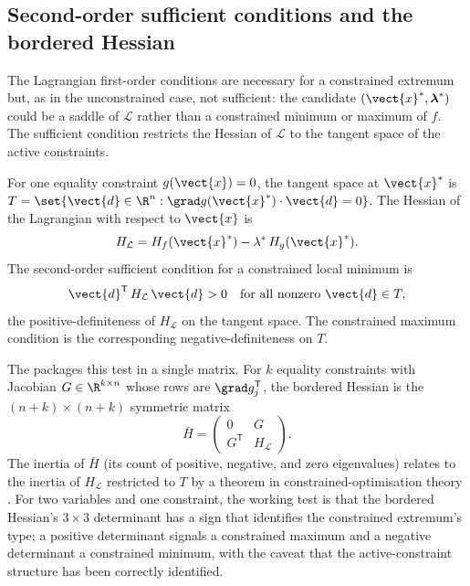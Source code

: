 \subsection{Second-order sufficient conditions and the bordered
Hessian}

The Lagrangian first-order conditions are necessary for a constrained
extremum but, as in the unconstrained case, not sufficient: the
candidate $(\vect{x}^{*}, \boldsymbol{\lambda}^{*})$ could be a
saddle of $\mathcal{L}$ rather than a constrained minimum or maximum
of $f$. The sufficient condition restricts the Hessian of
$\mathcal{L}$ to the tangent space of the active constraints.

For one equality constraint $g(\vect{x}) = 0$, the tangent space at
$\vect{x}^{*}$ is $T = \set{\vect{d} \in \R^{n} : \grad
g(\vect{x}^{*}) \cdot \vect{d} = 0}$. The Hessian of the Lagrangian
with respect to $\vect{x}$ is
\[
H_{\mathcal{L}} =
H_{f}(\vect{x}^{*}) - \lambda^{*}\,H_{g}(\vect{x}^{*}).
\]
The second-order sufficient condition for a constrained local
minimum is
\[
\vect{d}^{\mathsf{T}}\,H_{\mathcal{L}}\,\vect{d} > 0 \quad
\text{for all nonzero } \vect{d} \in T,
\]
the positive-definiteness of $H_{\mathcal{L}}$ on the tangent space.
The constrained maximum condition is the corresponding
negative-definiteness on $T$.

The  packages this test in a single
matrix. For $k$ equality constraints with Jacobian $G \in
\R^{k \times n}$ whose rows are $\grad g_{j}^{\mathsf{T}}$, the
bordered Hessian is the $(n + k) \times (n + k)$ symmetric matrix
\[
\bar{H} = \begin{pmatrix} 0 & G \\ G^{\mathsf{T}} & H_{\mathcal{L}}
\end{pmatrix}.
\]
The inertia of $\bar{H}$ (its count of positive, negative, and zero
eigenvalues) relates to the inertia of $H_{\mathcal{L}}$ restricted
to $T$ by a theorem in constrained-optimisation theory
\cite{text:v2ch11-nocedal-wright-2006}. For two variables and one
constraint, the working test is that the bordered Hessian's $3
\times 3$ determinant has a sign that identifies the constrained
extremum's type; a positive determinant signals a constrained
maximum and a negative determinant a constrained minimum, with the
caveat that the active-constraint structure has been correctly
identified.

